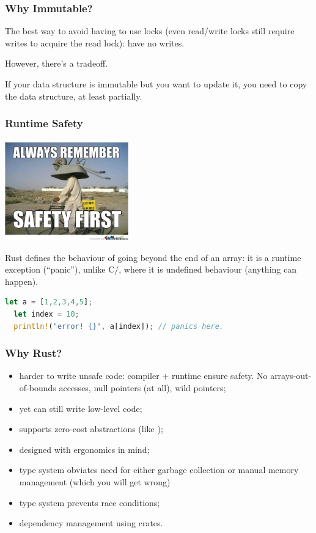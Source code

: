 \begin{frame}
\frametitle{Why Immutable?}

The best way to avoid having
to use locks (even read/write locks still require writes to acquire
the read lock): have no writes.  

However, there's a tradeoff. 

If your
data structure is immutable but you want to update it, you need to copy the data structure, at least
partially.


\end{frame}


\begin{frame}[fragile]
\frametitle{Runtime Safety}

\begin{center}
	\includegraphics[width=0.4\textwidth]{images/safetyfirst.jpg}
\end{center}

Rust defines
the behaviour of going beyond the end of an array: it is a runtime exception (``panic''),
unlike C/\CPP, where it is undefined behaviour (anything can happen).

\begin{lstlisting}[language=Rust]
  let a = [1,2,3,4,5];
  let index = 10;
  println!("error! {}", a[index]); // panics here.
\end{lstlisting}

\end{frame}

\begin{frame}
\frametitle{Why Rust?}

\begin{itemize}
\item harder to write unsafe code: compiler + runtime ensure safety. No arrays-out-of-bounds accesses, null pointers (at all), wild pointers;
\item yet can still write low-level code;
\item supports zero-cost abstractions (like \CPP);
\item designed with ergonomics in mind;
\item type system obviates need for either garbage collection or manual memory management (which you will get wrong)
\item type system prevents race conditions;
\item dependency management using crates.
\end{itemize}


\end{frame}


